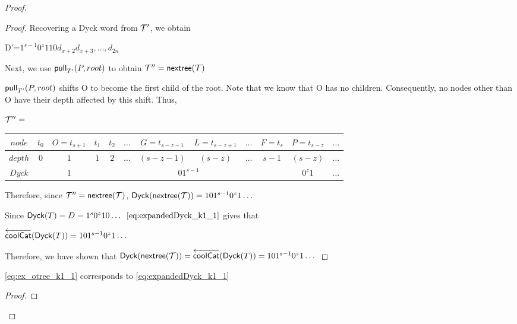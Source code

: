 \begin{proof}
\begin{proof}

    Recovering a Dyck word from $\tree{T}'$, we obtain 

    D'=$1^{s-1}0^z110d_{x+2}d_{x+3},\dots,d_{2n}$


    Next, we use $\poppush[T']{P}{root}$
 to obtain $\tree{T}'' = \nextTree{T}$

    $\poppush[T']{P}{root}$
 shifts O to become the first child of the root. Note that we know that O has no children. Consequently, no nodes other than O have their depth affected by this shift. Thus, 

    \bigskip
    \bigskip


    $\tree{T}''=$
    \begin{center}
	\begin{tabular}{ |c|c|c|c|c|c|c|c|c|c|c|c| } 
	    \hline

	    $node$ & $t_0$ & $O=t_{s+1}$ & $t_1$ & $t_2$ & $\dots$ & $G=t_{s-z-1}$ & $L=t_{s-z+1}$ & $\dots$ & $F=t_s$ & $P=t_{s-z}$ & $\dots$ \\
	    \hline
	    $depth$ & $0$ & $1$ & $1$ & $2$ &$\dots$ & $(s-z-1)$ & $(s-z)$ & $\dots$ & $s-1$ & $(s-z)$   & $\dots$\\
	    \hline
	    $Dyck$ &  & $1$ &  \multicolumn{7}{|c|}{$01^{s-1}$} &  $0^{z}1$   & $\dots$\\
	    \hline
	\end{tabular}
    \end{center}


    \bigskip
    \bigskip




    Therefore, since $\tree{T}''=\nextTree{T}$, $\dyck{\nextTree{T}}=101^{s-1}0^z1\dots$

    Since $\dyck{T}=D=1^s0^{z}10\dots$
    $\eqref{eq:expandedDyck_k1_1}$ gives that

    $\coolCat{\dyck{T}}=101^{s-1}0^z1\dots$

    Therefore, we have shown that $\dyck{\nextTree{T}}=\coolCat{\dyck{T}}=101^{s-1}0^z1\dots$

\end{proof}
\begin{lemma}
    \eqref{eq:ex_otree_k1_1} corresponds to \eqref{eq:expandedDyck_k1_1}
\end{lemma}
\begin{proof}


\end{proof}
\end{proof}
